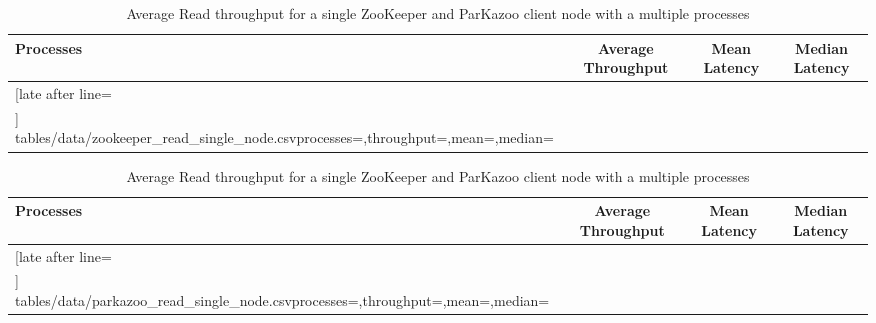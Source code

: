 \begin{table}[ht!]
	\centering
	\begin{subtable}{1.0\linewidth}
		\centering
		\begin{tabular}{|l|c|c|c|}\hline%
			\textbf{Processes}   & \textbf{Average Throughput} & \textbf{Mean Latency} & \textbf{Median Latency} \\\hline
			\csvreader[late after line=\\\hline]%
			{tables/data/zookeeper_read_single_node.csv}{processes=\processes,throughput=\throughput,mean=\mean,median=\median}%
			{\processes & \throughput & \mean & \median}%
		\end{tabular}
		\caption{ZooKeeper}
		\label{table:single_node_zookeeper_read_throughput}
	\end{subtable}
	\begin{subtable}{1.0\linewidth}
		\centering
		\begin{tabular}{|l|c|c|c|}\hline%
			\textbf{Processes}   & \textbf{Average Throughput} & \textbf{Mean Latency} & \textbf{Median Latency} \\\hline
			\csvreader[late after line=\\\hline]%
			{tables/data/parkazoo_read_single_node.csv}{processes=\processes,throughput=\throughput,mean=\mean,median=\median}%
			{\processes & \throughput & \mean & \median}%
		\end{tabular}
		\caption{ParKazoo}
		\label{table:single_node_parkazoo_read_throughput}
	\end{subtable}
	\caption{Average Read throughput for a single ZooKeeper and ParKazoo client node with a multiple processes}
	\label{table:single_node_read_throughput}
\end{table}
